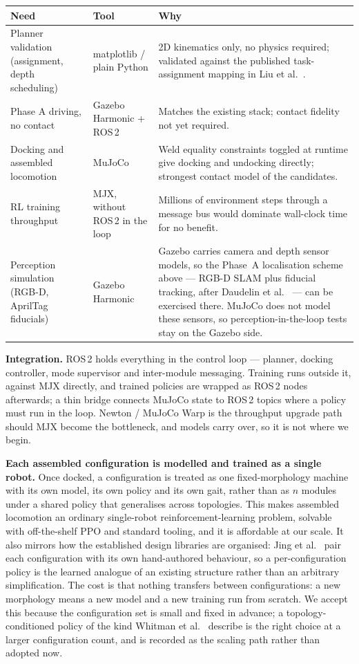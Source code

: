 \documentclass[11pt,a4paper]{article}
\begin{document}
\begin{longtable}{@{}L{0.26\textwidth} L{0.22\textwidth} L{0.42\textwidth}@{}}
\toprule
\textbf{Need} & \textbf{Tool} & \textbf{Why} \\
\midrule
\endhead
Planner validation (assignment, depth scheduling) &
  matplotlib / plain Python &
  2D kinematics only, no physics required; validated against the published
  task-assignment mapping in Liu et al.\ \cite{liu2023}. \\
Phase A driving, no contact &
  Gazebo Harmonic + ROS\,2 &
  Matches the existing stack; contact fidelity not yet required. \\
Docking and assembled locomotion &
  MuJoCo &
  Weld equality constraints toggled at runtime give docking and undocking
  directly; strongest contact model of the candidates. \\
RL training throughput &
  MJX, without ROS\,2 in the loop &
  Millions of environment steps through a message bus would dominate
  wall-clock time for no benefit. \\
Perception simulation (RGB-D, AprilTag fiducials) &
  Gazebo Harmonic &
  Gazebo carries camera and depth sensor models, so the Phase~A localisation
  scheme above --- RGB-D SLAM plus fiducial tracking, after Daudelin et al.\
  \cite{daudelin2018} --- can be exercised there. MuJoCo does not model these
  sensors, so perception-in-the-loop tests stay on the Gazebo side. \\
\bottomrule
\end{longtable}

\noindent\textbf{Integration.} ROS\,2 holds everything in the control loop ---
planner, docking controller, mode supervisor and inter-module messaging.
Training runs outside it, against MJX directly, and trained policies are
wrapped as ROS\,2 nodes afterwards; a thin bridge connects MuJoCo state to
ROS\,2 topics where a policy must run in the loop. Newton / MuJoCo Warp is the
throughput upgrade path should MJX become the bottleneck, and models carry
over, so it is not where we begin.

\noindent\textbf{Each assembled configuration is modelled and trained as a
single robot.} Once docked, a configuration is treated as one fixed-morphology
machine with its own model, its own policy and its own gait, rather than as $n$
modules under a shared policy that generalises across topologies. This makes
assembled locomotion an ordinary single-robot reinforcement-learning problem,
solvable with off-the-shelf PPO and standard tooling, and it is affordable at
our scale. It also mirrors how the established design libraries are organised:
Jing et al.\ \cite{jing2016,jing2018} pair each configuration with its own
hand-authored behaviour, so a per-configuration policy is the learned analogue
of an existing structure rather than an arbitrary simplification. The cost is
that nothing transfers between configurations: a new morphology means a new
model and a new training run from scratch. We accept this because the
configuration set is small and fixed in advance; a topology-conditioned policy
of the kind Whitman et al.\ \cite{whitman2023} describe is the right choice at a
larger configuration count, and is recorded as the scaling path rather than
adopted now.
\end{document}
